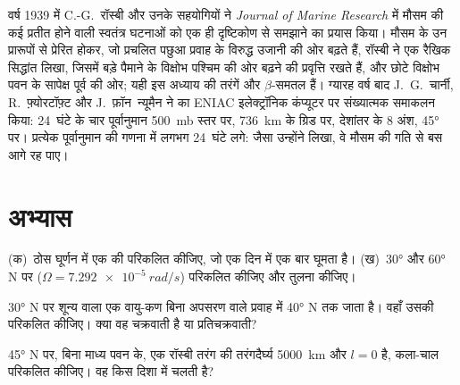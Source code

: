 \begin{history}[दीर्घ तरंगों से पहले संगणित पूर्वानुमान तक]
वर्ष 1939 में C.-G.~रॉस्बी और उनके सहयोगियों ने \emph{Journal of Marine Research}
में मौसम की कई प्रतीत होने वाली स्वतंत्र घटनाओं को एक ही दृष्टिकोण से समझाने का प्रयास किया।
मौसम के उन प्रारूपों से प्रेरित होकर, जो प्रचलित पछुआ प्रवाह के विरुद्ध
उजानी की ओर बढ़ते हैं, रॉस्बी ने एक रैखिक सिद्धांत लिखा, जिसमें
बड़े पैमाने के विक्षोभ पश्चिम की ओर बढ़ने की प्रवृत्ति रखते हैं, और
छोटे विक्षोभ पवन के सापेक्ष पूर्व की ओर; यही इस अध्याय की तरंगें और
$\beta$-समतल हैं। ग्यारह वर्ष बाद J.~G.~चार्नी,
R.~फ़्योरटॉफ़्ट और J.~फ़ॉन~न्यूमैन ने  का
ENIAC इलेक्ट्रॉनिक कंप्यूटर पर संख्यात्मक समाकलन किया: 24~घंटे के चार पूर्वानुमान
\qty{500}{mb} स्तर पर, \qty{736}{km} के ग्रिड पर, देशांतर के 8 अंश,
\ang{45} पर। प्रत्येक पूर्वानुमान की गणना में लगभग 24~घंटे लगे:
जैसा उन्होंने लिखा, वे मौसम की गति से बस आगे रह पाए।
\end{history}

\section{अभ्यास}

\begin{exercise}[$\star$]\label{exo:b3:atmospheric-dynamics:1}
(क)~ठोस घूर्णन में एक  की  परिकलित कीजिए, जो
एक दिन में एक बार घूमता है। (ख)~\ang{30} और \ang{60} N पर 
($\Omega = \qty{7.292e-5}{rad/s}$) परिकलित कीजिए और तुलना कीजिए।
\end{exercise}

\begin{exercise}[$\star$]\label{exo:b3:atmospheric-dynamics:2}
\ang{30} N पर शून्य  वाला एक वायु-कण
बिना अपसरण वाले प्रवाह में \ang{40} N तक जाता है। वहाँ उसकी  परिकलित कीजिए। क्या वह
चक्रवाती है या प्रतिचक्रवाती?
\end{exercise}

\begin{exercise}[$\star$]\label{exo:b3:atmospheric-dynamics:3}
\ang{45} N पर, बिना माध्य पवन के, एक रॉस्बी तरंग की
तरंगदैर्घ्य \qty{5000}{km} और $l = 0$ है, कला-चाल परिकलित कीजिए। वह किस दिशा में चलती है?
\end{exercise}

